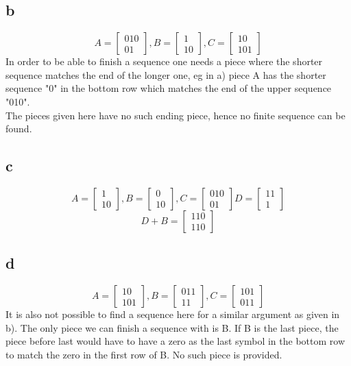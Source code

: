 \documentclass[12pt]{article}
\begin{document}
\subsection*{b}
\[
A =\begin{bmatrix}
0 1 0\\
 0 1  
\end{bmatrix}, 
B = \begin{bmatrix}
 1\\
1 0  
\end{bmatrix},
C = \begin{bmatrix}
 1 0\\
1 0 1
\end{bmatrix}
\]
In order to be able to finish a sequence one needs a piece where the shorter sequence matches the end of the longer one, eg in a) piece A has the shorter sequence "0" in the bottom row which matches the end of the upper sequence "010".\\
The pieces given here have no such ending piece, hence no finite sequence can be found.

\subsection*{c}
\[
A =\begin{bmatrix}
1\\
1 0  
\end{bmatrix}, 
B = \begin{bmatrix}
0\\
1 0  
\end{bmatrix},
C = \begin{bmatrix}
0 1 0\\
0 1
\end{bmatrix}
D = \begin{bmatrix}
1 1\\
1
\end{bmatrix}
\]
\[
D+B =\begin{bmatrix}
1 1  0\\
 1  1 0
\end{bmatrix}
\]


\subsection*{d}
\[
A =\begin{bmatrix}
1 0\\
1 0 1  
\end{bmatrix}, 
B = \begin{bmatrix}
011\\
1 1  
\end{bmatrix},
C = \begin{bmatrix}
1 0 1\\
0 1 1
\end{bmatrix}
\]
It is also not possible to find a sequence here for a similar argument as given in b). The only piece we can finish a sequence with is B. If B is the last piece, the piece before last would have to have a zero as the last symbol in the bottom row to match the zero in the first row of B. No such piece is provided.
\end{document}

